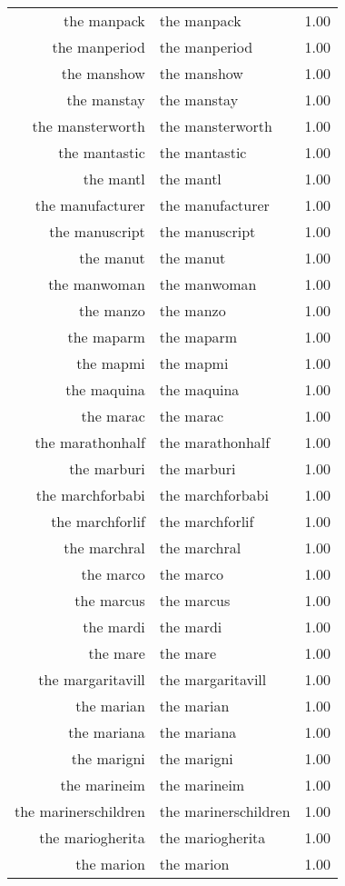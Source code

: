 \begin{table}[ht]
\begin{tabular}{rlr}
  the manpack & the manpack & 1.00 \\ 
  the manperiod & the manperiod & 1.00 \\ 
  the manshow & the manshow & 1.00 \\ 
  the manstay & the manstay & 1.00 \\ 
  the mansterworth & the mansterworth & 1.00 \\ 
  the mantastic & the mantastic & 1.00 \\ 
  the mantl & the mantl & 1.00 \\ 
  the manufacturer & the manufacturer & 1.00 \\ 
  the manuscript & the manuscript & 1.00 \\ 
  the manut & the manut & 1.00 \\ 
  the manwoman & the manwoman & 1.00 \\ 
  the manzo & the manzo & 1.00 \\ 
  the maparm & the maparm & 1.00 \\ 
  the mapmi & the mapmi & 1.00 \\ 
  the maquina & the maquina & 1.00 \\ 
  the marac & the marac & 1.00 \\ 
  the marathonhalf & the marathonhalf & 1.00 \\ 
  the marburi & the marburi & 1.00 \\ 
  the marchforbabi & the marchforbabi & 1.00 \\ 
  the marchforlif & the marchforlif & 1.00 \\ 
  the marchral & the marchral & 1.00 \\ 
  the marco & the marco & 1.00 \\ 
  the marcus & the marcus & 1.00 \\ 
  the mardi & the mardi & 1.00 \\ 
  the mare & the mare & 1.00 \\ 
  the margaritavill & the margaritavill & 1.00 \\ 
  the marian & the marian & 1.00 \\ 
  the mariana & the mariana & 1.00 \\ 
  the marigni & the marigni & 1.00 \\ 
  the marineim & the marineim & 1.00 \\ 
  the marinerschildren & the marinerschildren & 1.00 \\ 
  the mariogherita & the mariogherita & 1.00 \\ 
  the marion & the marion & 1.00 \\ 

\end{tabular}
\end{table}
